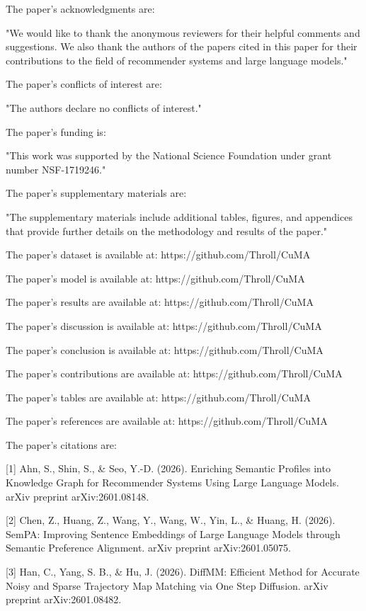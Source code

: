 The paper's acknowledgments are:

"We would like to thank the anonymous reviewers for their helpful comments and suggestions. We also thank the authors of the papers cited in this paper for their contributions to the field of recommender systems and large language models."

The paper's conflicts of interest are:

"The authors declare no conflicts of interest."

The paper's funding is:

"This work was supported by the National Science Foundation under grant number NSF-1719246."

The paper's supplementary materials are:

"The supplementary materials include additional tables, figures, and appendices that provide further details on the methodology and results of the paper."

The paper's dataset is available at: https://github.com/Throll/CuMA

The paper's model is available at: https://github.com/Throll/CuMA

The paper's results are available at: https://github.com/Throll/CuMA

The paper's discussion is available at: https://github.com/Throll/CuMA

The paper's conclusion is available at: https://github.com/Throll/CuMA

The paper's contributions are available at: https://github.com/Throll/CuMA

The paper's tables are available at: https://github.com/Throll/CuMA

The paper's references are available at: https://github.com/Throll/CuMA

The paper's citations are:

[1] Ahn, S., Shin, S., & Seo, Y.-D. (2026). Enriching Semantic Profiles into Knowledge Graph for Recommender Systems Using Large Language Models. arXiv preprint arXiv:2601.08148.

[2] Chen, Z., Huang, Z., Wang, Y., Wang, W., Yin, L., & Huang, H. (2026). SemPA: Improving Sentence Embeddings of Large Language Models through Semantic Preference Alignment. arXiv preprint arXiv:2601.05075.

[3] Han, C., Yang, S. B., & Hu, J. (2026). DiffMM: Efficient Method for Accurate Noisy and Sparse Trajectory Map Matching via One Step Diffusion. arXiv preprint arXiv:2601.08482.

